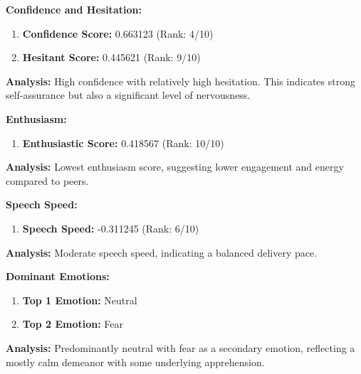 \documentclass{article}
\begin{document}
\large{\textbf{Confidence and Hesitation:}}
\begin{tcolorbox}[title=Confidence and Hesitant Scores]
    \begin{enumerate}
        \item \textbf{Confidence Score:} \textcolor{green!50!black}{0.663123} (Rank: 4/10)
        \item \textbf{Hesitant Score:} \textcolor{red!70!black}{0.445621} (Rank: 9/10)
    \end{enumerate}
\end{tcolorbox}
    \textbf{Analysis:} High confidence with relatively high hesitation. This indicates strong self-assurance but also a significant level of nervousness.

\large{\textbf{Enthusiasm:}}
\begin{tcolorbox}[ colback=purple!5!white,colframe=purple!75!black,  title=Enthusiastic Score]
    \begin{enumerate}
        \item \textbf{Enthusiastic Score:} \textcolor{orange!70!black}{0.418567} (Rank: 10/10)
    \end{enumerate}
\end{tcolorbox}
    \textbf{Analysis:} Lowest enthusiasm score, suggesting lower engagement and energy compared to peers.

\large{\textbf{Speech Speed:}}
\begin{tcolorbox}[title=Speech Speed]
    \begin{enumerate}
        \item \textbf{Speech Speed:} \textcolor{purple!70!black}{-0.311245} (Rank: 6/10)
    \end{enumerate}
\end{tcolorbox}
    \textbf{Analysis:} Moderate speech speed, indicating a balanced delivery pace.

\large{\textbf{Dominant Emotions:}}
\begin{tcolorbox}[colback=cyan!5!white,colframe=cyan!75!black,title=Emotional State]
    \begin{enumerate}
        \item \textbf{Top 1 Emotion:} \textcolor{blue!80!black}{Neutral}
        \item \textbf{Top 2 Emotion:} \textcolor{red!80!black}{Fear}
    \end{enumerate}
\end{tcolorbox}
    \textbf{Analysis:} Predominantly neutral with fear as a secondary emotion, reflecting a mostly calm demeanor with some underlying apprehension.
\end{document}
